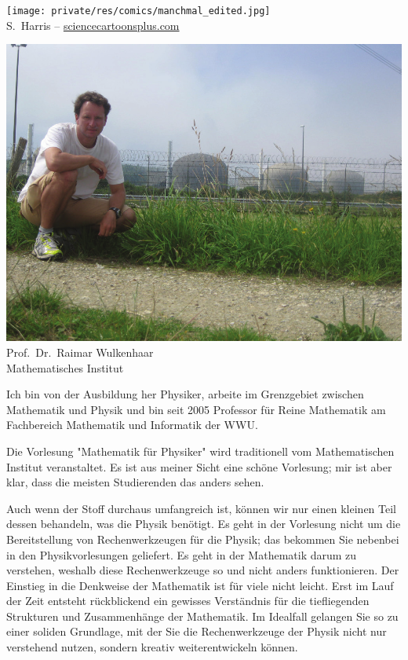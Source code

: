 \begin{multicols}{2}
\begin{center}
\texttt{[image: private/res/comics/manchmal\_edited.jpg]}\\
{\footnotesize 
S.~Harris – \url{sciencecartoonsplus.com}
}
\end{center}

\end{multicols}

\vfill

\newpage

\begin{multicols}{2}
\begin{center}
	\includegraphics[width=0.9\columnwidth]{res/vorstellungsfotos/wulkenhaar.png}\\
	\smallskip
 	Prof.\ Dr.\ Raimar Wulkenhaar\\
	Mathematisches Institut
\end{center}

Ich bin von der Ausbildung her Physiker, arbeite im Grenzgebiet zwischen Mathematik und Physik und bin seit 2005 Professor für Reine Mathematik am Fachbereich Mathematik und Informatik der WWU.

Die Vorlesung "Mathematik für Physiker" wird traditionell vom Mathematischen Institut veranstaltet. Es ist aus meiner Sicht eine schöne Vorlesung; mir ist aber klar, dass die meisten Studierenden das anders sehen.

Auch wenn der Stoff durchaus umfangreich ist, können wir nur einen kleinen Teil dessen behandeln, was die Physik benötigt. Es geht in der Vorlesung nicht um die Bereitstellung von Rechenwerkzeugen für die Physik; das bekommen Sie nebenbei in den Physikvorlesungen geliefert. Es geht in der Mathematik darum zu verstehen, weshalb diese Rechenwerkzeuge so und nicht anders funktionieren. Der Einstieg in die Denkweise der Mathematik ist für viele nicht leicht. Erst im Lauf der Zeit entsteht rückblickend ein gewisses Verständnis für die tiefliegenden Strukturen und Zusammenhänge der Mathematik. Im Idealfall gelangen Sie so zu einer soliden Grundlage, mit der Sie die Rechenwerkzeuge der Physik nicht nur verstehend nutzen, sondern kreativ weiterentwickeln können.



\end{multicols}
